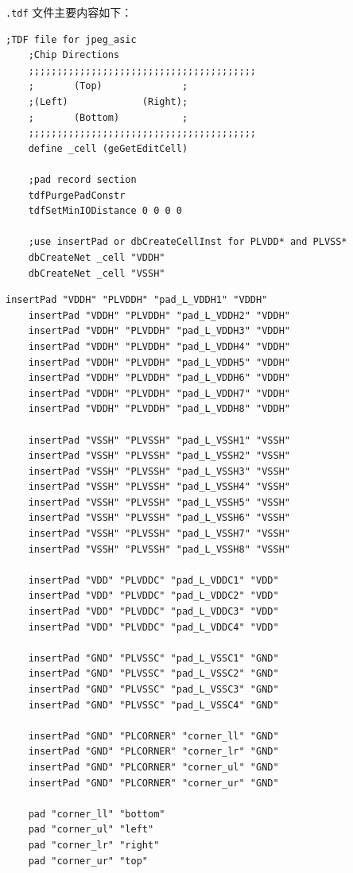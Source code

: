 \documentclass[12pt,hyperref,a4paper,UTF8]{ctexart}
\begin{document}
\texttt{.tdf} 文件主要内容如下：
\begin{lstlisting}[style=tdfstyle,name=jpeg_asic.tdf]
    ;TDF file for jpeg_asic
    ;Chip Directions
    ;;;;;;;;;;;;;;;;;;;;;;;;;;;;;;;;;;;;;;;;
    ;		(Top)		       ;
    ;(Left)				(Right);
    ;		(Bottom)	       ;
    ;;;;;;;;;;;;;;;;;;;;;;;;;;;;;;;;;;;;;;;;
    define _cell (geGetEditCell)

    ;pad record section
    tdfPurgePadConstr
    tdfSetMinIODistance 0 0 0 0

    ;use insertPad or dbCreateCellInst for PLVDD* and PLVSS*
    dbCreateNet _cell "VDDH"
    dbCreateNet _cell "VSSH"
\end{lstlisting}

\newpage
\begin{lstlisting}[style=tdfstyle,name=jpeg_asic.tdf]
    insertPad "VDDH" "PLVDDH" "pad_L_VDDH1" "VDDH"
    insertPad "VDDH" "PLVDDH" "pad_L_VDDH2" "VDDH"
    insertPad "VDDH" "PLVDDH" "pad_L_VDDH3" "VDDH"
    insertPad "VDDH" "PLVDDH" "pad_L_VDDH4" "VDDH"
    insertPad "VDDH" "PLVDDH" "pad_L_VDDH5" "VDDH"
    insertPad "VDDH" "PLVDDH" "pad_L_VDDH6" "VDDH"
    insertPad "VDDH" "PLVDDH" "pad_L_VDDH7" "VDDH"
    insertPad "VDDH" "PLVDDH" "pad_L_VDDH8" "VDDH"

    insertPad "VSSH" "PLVSSH" "pad_L_VSSH1" "VSSH"
    insertPad "VSSH" "PLVSSH" "pad_L_VSSH2" "VSSH"
    insertPad "VSSH" "PLVSSH" "pad_L_VSSH3" "VSSH"
    insertPad "VSSH" "PLVSSH" "pad_L_VSSH4" "VSSH"
    insertPad "VSSH" "PLVSSH" "pad_L_VSSH5" "VSSH"
    insertPad "VSSH" "PLVSSH" "pad_L_VSSH6" "VSSH"
    insertPad "VSSH" "PLVSSH" "pad_L_VSSH7" "VSSH"
    insertPad "VSSH" "PLVSSH" "pad_L_VSSH8" "VSSH"

    insertPad "VDD" "PLVDDC" "pad_L_VDDC1" "VDD"
    insertPad "VDD" "PLVDDC" "pad_L_VDDC2" "VDD"
    insertPad "VDD" "PLVDDC" "pad_L_VDDC3" "VDD"
    insertPad "VDD" "PLVDDC" "pad_L_VDDC4" "VDD"

    insertPad "GND" "PLVSSC" "pad_L_VSSC1" "GND"
    insertPad "GND" "PLVSSC" "pad_L_VSSC2" "GND"
    insertPad "GND" "PLVSSC" "pad_L_VSSC3" "GND"
    insertPad "GND" "PLVSSC" "pad_L_VSSC4" "GND"

    insertPad "GND" "PLCORNER" "corner_ll" "GND"
    insertPad "GND" "PLCORNER" "corner_lr" "GND"
    insertPad "GND" "PLCORNER" "corner_ul" "GND"
    insertPad "GND" "PLCORNER" "corner_ur" "GND"

    pad	"corner_ll"	"bottom" 	
    pad	"corner_ul"	"left"	 
    pad	"corner_lr"	"right"	 	
    pad	"corner_ur"	"top"	 
\end{lstlisting}
\end{document}
